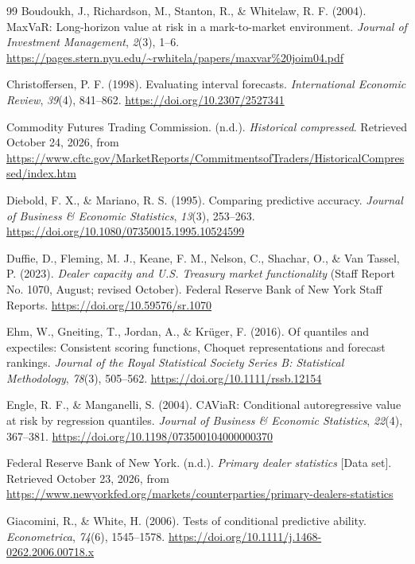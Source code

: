 \documentclass[11pt,a4paper]{article}
\begin{document}
\begin{thebibliography}{99}
 Boudoukh, J., Richardson, M., Stanton, R., \& Whitelaw, R. F. (2004). MaxVaR: Long-horizon value at risk in a mark-to-market environment. \emph{Journal of Investment Management}, \emph{2}(3), 1--6. \url{https://pages.stern.nyu.edu/~rwhitela/papers/maxvar%20joim04.pdf}

 Christoffersen, P. F. (1998). Evaluating interval forecasts. \emph{International Economic Review}, \emph{39}(4), 841--862. \url{https://doi.org/10.2307/2527341}

 Commodity Futures Trading Commission. (n.d.). \emph{Historical compressed}. Retrieved October 24, 2026, from \url{https://www.cftc.gov/MarketReports/CommitmentsofTraders/HistoricalCompressed/index.htm}

 Diebold, F. X., \& Mariano, R. S. (1995). Comparing predictive accuracy. \emph{Journal of Business \& Economic Statistics}, \emph{13}(3), 253--263. \url{https://doi.org/10.1080/07350015.1995.10524599}

 Duffie, D., Fleming, M. J., Keane, F. M., Nelson, C., Shachar, O., \& Van Tassel, P. (2023). \emph{Dealer capacity and U.S. Treasury market functionality} (Staff Report No. 1070, August; revised October). Federal Reserve Bank of New York Staff Reports. \url{https://doi.org/10.59576/sr.1070}

 Ehm, W., Gneiting, T., Jordan, A., \& Krüger, F. (2016). Of quantiles and expectiles: Consistent scoring functions, Choquet representations and forecast rankings. \emph{Journal of the Royal Statistical Society Series B: Statistical Methodology}, \emph{78}(3), 505--562. \url{https://doi.org/10.1111/rssb.12154}

 Engle, R. F., \& Manganelli, S. (2004). CAViaR: Conditional autoregressive value at risk by regression quantiles. \emph{Journal of Business \& Economic Statistics}, \emph{22}(4), 367--381. \url{https://doi.org/10.1198/073500104000000370}

 Federal Reserve Bank of New York. (n.d.). \emph{Primary dealer statistics} [Data set]. Retrieved October 23, 2026, from \url{https://www.newyorkfed.org/markets/counterparties/primary-dealers-statistics}

 Giacomini, R., \& White, H. (2006). Tests of conditional predictive ability. \emph{Econometrica}, \emph{74}(6), 1545--1578. \url{https://doi.org/10.1111/j.1468-0262.2006.00718.x}


\end{thebibliography}
\end{document}

